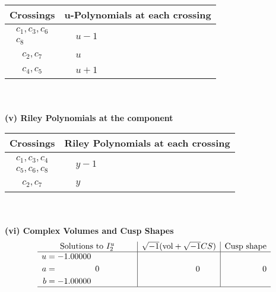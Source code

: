 \documentclass[1p]{elsarticle_modified}
\theoremstyle{definition}
\newcommand{\I}{\sqrt{-1}}
\begin{document}
\begin{tabular}{m{50pt}|m{274pt}}
Crossings & \hspace{64pt}u-Polynomials at each crossing \\
\hline $$\begin{aligned}c_{1},c_{3},c_{6}\\c_{8}\end{aligned}$$&$\begin{aligned}
&u-1
\end{aligned}$\\
\hline $$\begin{aligned}c_{2},c_{7}\end{aligned}$$&$\begin{aligned}
&u
\end{aligned}$\\
\hline $$\begin{aligned}c_{4},c_{5}\end{aligned}$$&$\begin{aligned}
&u+1
\end{aligned}$\\
\hline
\end{tabular}\\~\\
\newpage\renewcommand{\arraystretch}{1}
\flushleft \textbf{(v) Riley Polynomials at the component}\newline \\
\begin{tabular}{m{50pt}|m{274pt}}
Crossings & \hspace{64pt}Riley Polynomials at each crossing \\
\hline $$\begin{aligned}c_{1},c_{3},c_{4}\\c_{5},c_{6},c_{8}\end{aligned}$$&$\begin{aligned}
&y-1
\end{aligned}$\\
\hline $$\begin{aligned}c_{2},c_{7}\end{aligned}$$&$\begin{aligned}
&y
\end{aligned}$\\
\hline
\end{tabular}\\~\\
\newpage\flushleft \textbf{(vi) Complex Volumes and Cusp Shapes}
$$\begin{array}{c|c|c}  
\text{Solutions to }I^u_{2}& \I (\text{vol} + \sqrt{-1}CS) & \text{Cusp shape}\\
 \hline 
\begin{aligned}
u &= -1.00000\phantom{ +0.000000I} \\
a &= \phantom{-0.000000 } 0 \\
b &= -1.00000\phantom{ +0.000000I}\end{aligned}
 & \phantom{-0.000000 } 0 & \phantom{-0.000000 } 0\\
 \hline 
 \end{array}$$\newpage
\end{document}
